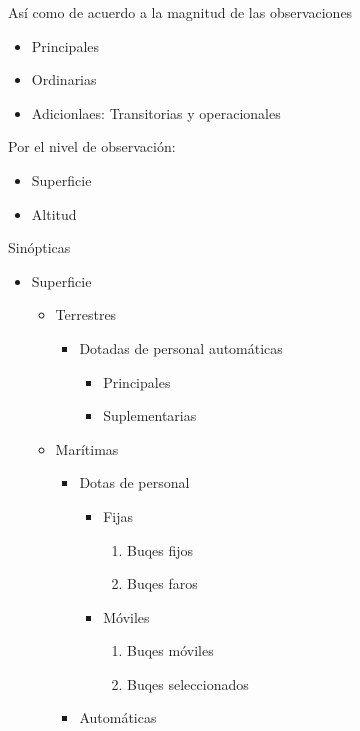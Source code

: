 Así como de acuerdo a la magnitud de las observaciones
\begin{itemize}
    \item Principales
    \item Ordinarias
    \item Adicionlaes: Transitorias y operacionales
\end{itemize}

Por el nivel de observación:
\begin{itemize}
    \item Superficie
    \item Altitud
\end{itemize}

Sinópticas

\begin{itemize}
    \item Superficie \begin{itemize}
        \item Terrestres \begin{itemize}
            \item Dotadas de personal automáticas \begin{itemize}
                \item Principales
                \item Suplementarias
            \end{itemize}
        \end{itemize}
        \item Marítimas \begin{itemize}
            \item Dotas de personal \begin{itemize}
                \item Fijas \begin{enumerate}
                    \item Buqes fijos
                    \item Buqes faros
                \end{enumerate}
                \item Móviles \begin{enumerate}
                    \item Buqes móviles
                    \item Buqes seleccionados
                \end{enumerate}
            \end{itemize}
            \item Automáticas \begin{itemize}

\end{itemize}
\end{itemize}
\end{itemize}
\end{itemize}
